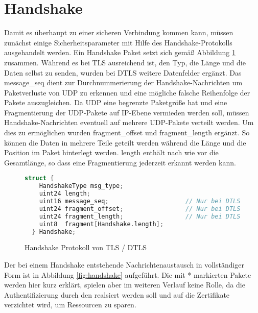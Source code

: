 \section{Handshake}

Damit es überhaupt zu einer sicheren Verbindung kommen kann, müssen zunächst einige Sicherheitsparameter mit Hilfe des Handshake-Protokolls ausgehandelt werden.
Ein Handshake Paket setzt sich gemäß Abbildung \ref{fig:handshakelayer} zusammen. Während es bei TLS ausreichend ist, den Typ, die Länge und die Daten selbst
zu senden, wurden bei DTLS weitere Datenfelder ergänzt. Das message\_seq dient zur Durchnummerierung der Handshake-Nachrichten um Paketverluste von UDP zu erkennen
und eine mögliche falsche Reihenfolge der Pakete auszugleichen. Da UDP eine begrenzte Paketgröße hat und eine Fragmentierung der UDP-Pakete auf IP-Ebene
vermieden werden soll, müssen Handshake-Nachrichten eventuell auf mehrere UDP-Pakete verteilt werden. Um dies zu ermöglichen wurden fragment\_offset und fragment\_length
ergänzt. So können die Daten in mehrere Teile geteilt werden während die Länge und die Position im Paket hinterlegt werden. length enthält nach wie vor die
Gesamtlänge, so dass eine Fragmentierung jederzeit erkannt werden kann.

\begin{figure}[ht]
  \centering
  \begin{lstlisting}[language=c]
  struct {
    HandshakeType msg_type;
    uint24 length;
    uint16 message_seq;                     // Nur bei DTLS
    uint24 fragment_offset;                 // Nur bei DTLS
    uint24 fragment_length;                 // Nur bei DTLS
    uint8  fragment[Handshake.length];
  } Handshake;
  \end{lstlisting}
  \caption{Handshake Protokoll von TLS / DTLS}
  \label{fig:handshakelayer}
\end{figure}

Der bei einem Handshake entstehende Nachrichtenaustausch in vollständiger Form ist in Abbildung \ref{fig:handshake} aufgeführt.
Die mit * markierten Pakete werden hier kurz erklärt, spielen aber im weiteren Verlauf keine Rolle, da die Authentifizierung durch
den  realsiert werden soll und auf die Zertifikate verzichtet wird, um Ressourcen zu sparen.

